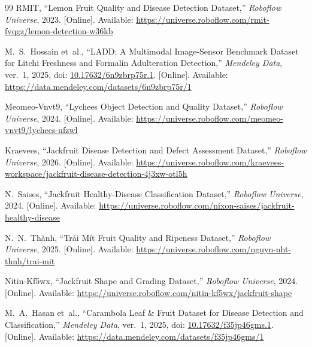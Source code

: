 \documentclass[11pt,a4paper]{article}
\begin{document}
\begin{thebibliography}{99}
RMIT, ``Lemon Fruit Quality and Disease Detection Dataset,'' \emph{Roboflow Universe}, 2023. [Online]. Available: \url{https://universe.roboflow.com/rmit-fvqgz/lemon-detection-w36kb}


M.~S.~Hossain et~al., ``LADD: A Multimodal Image-Sensor Benchmark Dataset for Litchi Freshness and Formalin Adulteration Detection,'' \emph{Mendeley Data}, ver.~1, 2025, doi: \href{https://doi.org/10.17632/6n9zbrp75r.1}{10.17632/6n9zbrp75r.1}. [Online]. Available: \url{https://data.mendeley.com/datasets/6n9zbrp75r/1}

Meomeo-Vnvt9, ``Lychees Object Detection and Quality Dataset,'' \emph{Roboflow Universe}, 2024. [Online]. Available: \url{https://universe.roboflow.com/meomeo-vnvt9/lychees-ufzwl}


Kraevees, ``Jackfruit Disease Detection and Defect Assessment Dataset,'' \emph{Roboflow Universe}, 2026. [Online]. Available: \url{https://universe.roboflow.com/kraevees-workspace/jackfruit-disease-detection-4j3xw-otl5h}

N.~Saises, ``Jackfruit Healthy-Disease Classification Dataset,'' \emph{Roboflow Universe}, 2024. [Online]. Available: \url{https://universe.roboflow.com/nixon-saises/jackfruit-healthy-disease}

N.~N.~Th\`anh, ``Tr\'ai M\'it Fruit Quality and Ripeness Dataset,'' \emph{Roboflow Universe}, 2025. [Online]. Available: \url{https://universe.roboflow.com/nguyn-nht-thnh/trai-mit}

Nitin-Kf5wx, ``Jackfruit Shape and Grading Dataset,'' \emph{Roboflow Universe}, 2024. [Online]. Available: \url{https://universe.roboflow.com/nitin-kf5wx/jackfruit-shape}


M.~A.~Hasan et~al., ``Carambola Leaf \& Fruit Dataset for Disease Detection and Classification,'' \emph{Mendeley Data}, ver.~1, 2025, doi: \href{https://doi.org/10.17632/f35jp46gms.1}{10.17632/f35jp46gms.1}. [Online]. Available: \url{https://data.mendeley.com/datasets/f35jp46gms/1}



\end{thebibliography}
\end{document}
